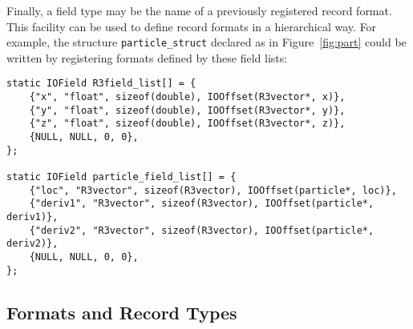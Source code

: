 \documentclass{article}
\begin{document}
Finally, a field type may be the name of a previously registered record
format.  This facility can be used to define record formats in a hierarchical
way.  For example, the structure {\tt particle\_struct} declared as in
Figure~\ref{fig:part} could be written by registering formats defined by these
field lists:
\begin{verbatim}
static IOField R3field_list[] = {
    {"x", "float", sizeof(double), IOOffset(R3vector*, x)},
    {"y", "float", sizeof(double), IOOffset(R3vector*, y)},
    {"z", "float", sizeof(double), IOOffset(R3vector*, z)},
    {NULL, NULL, 0, 0},
};

static IOField particle_field_list[] = {
    {"loc", "R3vector", sizeof(R3vector), IOOffset(particle*, loc)},
    {"deriv1", "R3vector", sizeof(R3vector), IOOffset(particle*, deriv1)},
    {"deriv2", "R3vector", sizeof(R3vector), IOOffset(particle*, deriv2)},
    {NULL, NULL, 0, 0},
};
\end{verbatim}


\subsection{Formats and Record Types}
\end{document}
